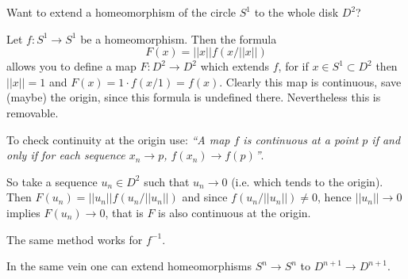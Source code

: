 \documentclass[12pt]{article}
\begin{document}
Want to extend a homeomorphism of the circle $S^1$ to the whole disk $D^2$?

Let $f\colon S^1\to S^1$ be a homeomorphism. Then the formula 
$$F(x)=||x||f(x/||x||)$$
allows you to define a map $F\colon D^2\to D^2$
which extends $f$, for if $x\in S^1\subset D^2$ then $||x||=1$ and $F(x)=1\cdot f(x/1)=f(x)$. Clearly this map is continuous, save (maybe) the origin, since this formula is undefined there. Nevertheless this is removable.

To check continuity at the origin use: {\it ``A map $f$ is continuous at a point $p$ if and only if  for each sequence $x_n\to p$, $f(x_n)\to f(p)$''}.

So take a sequence $u_n\in D^2$ such that $u_n\to 0$ (i.e. which tends to the origin). Then $F(u_n)=||u_n||f(u_n/||u_n||)$ and since $f(u_n/||u_n||)\neq 0$, hence $||u_n||\to 0$ implies $F(u_n)\to 0$, that is $F$ is also continuous at the origin. 

The same method works for $f^{-1}$.

In the same vein one can extend homeomorphisms $S^n\to S^n$ to $D^{n+1}\to D^{n+1}$.
\end{document}
